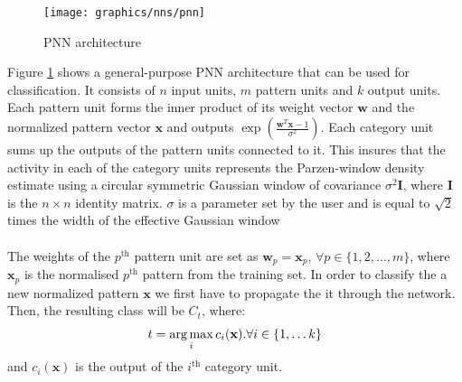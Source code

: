   	\begin{figure}[H]
 		\centering
 		\texttt{[image: graphics/nns/pnn]}
 		\caption{PNN architecture}
 		\label{Fig 2.8}
 	\end{figure}
	 
	 Figure \ref{Fig 2.8} shows a general-purpose PNN architecture that can be used for classification. It consists of $n$ input units, $m$ pattern units and $k$ output units. Each pattern unit forms the inner product of its weight vector $\mathbf{w}$ and the normalized pattern vector $\mathbf{x}$ and outputs $\exp(\frac{\mathbf{w}^T\mathbf{x} - 1}{\sigma^2})$. Each category unit sums up the outputs of the pattern units connected to it. This insures that the activity in each of the category units represents the Parzen-window density estimate using a circular symmetric Gaussian window of covariance $\sigma^2\mathbf{I}$, where $\mathbf{I}$ is the $n\times n$ identity matrix. $\sigma$ is a parameter set by the user and is equal to $\sqrt{2}$ times the width of the effective Gaussian window
     \\ \\ 
	 The weights of the $p^\text{th}$ pattern unit are set as $\mathbf{w}_p = \mathbf{x}_p$, $\forall p \in \{ 1,2,\dots ,m \}$, where $\mathbf{x}_p$ is the normalised $p^\text{th}$ pattern from the training set. In order to classify the a new normalized pattern $\mathbf{x}$ we first have to propagate the it through the network. Then, the resulting class will be $C_t$, where:
	 \begin{equation}
		 t = \operatorname*{arg\,max}_i c_i(\mathbf{x}). \forall i \in \{1,\dots k\}
	 \end{equation}
	 and $c_i(\mathbf{x})$ is the output of the $i^\text{th}$ category unit.
